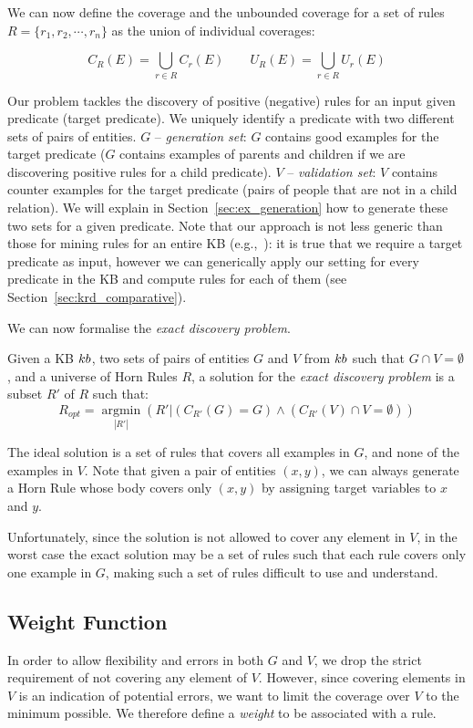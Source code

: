 We can now define the coverage and the unbounded coverage for a set of rules $R=\{r_1,r_2,\cdots,r_n\}$ as the union of individual coverages:

$$C_R(E) = \bigcup \limits_{r \in R} C_r(E) \qquad U_R(E) = \bigcup \limits_{r \in R} U_r(E) $$

Our problem tackles the discovery of positive (negative) rules for an input given predicate (target predicate). We uniquely identify a predicate with two different sets of pairs of entities.
$G$ -- \emph{generation set}: $G$ contains good examples for the target predicate ($G$ contains examples of parents and children if we are discovering positive rules for a child predicate).
$V$ -- \emph{validation set}: $V$ contains counter examples for the target predicate (pairs of people that are not in a child relation).
We will explain in Section~\ref{sec:ex_generation} how to generate these two sets for a given predicate. Note that our approach is not less generic than those for mining rules for an entire KB (e.g.,~\cite{abedjan2014amending,galarraga2015fast}): it is true that we require a target predicate as input, however we can generically apply our setting for every predicate in the KB and compute rules for each of them (see Section~\ref{sec:krd_comparative}).

We can now formalise the \emph{exact discovery problem}.
\begin{definition}
	Given a KB ${\sc kb}$, two sets of pairs of entities $G$ and $V$ from ${\sc kb}$ such that $G \cap V = \emptyset$, and a universe of Horn Rules $R$, a solution for the \emph{exact discovery problem} is a subset $R'$ of $R$  such that:
	$$R_{opt}=\underset{|R'|}{\operatorname{argmin}}(R'|(C_{R'}(G) = G) \wedge (C_{R'}(V) \cap V = \emptyset) )$$
\end{definition}
The ideal solution is a set of rules that covers all examples in $G$, and none of the examples in $V$. Note that given a pair of entities $(x,y)$, we can always generate a Horn Rule whose body covers only $(x,y)$ by assigning target variables to $x$ and $y$.

Unfortunately, since the solution is not allowed to cover any element in $V$, in the worst case the exact solution may be a set of rules such that each rule covers only one example in $G$, making such a set of rules difficult to use and understand.

\subsection{Weight Function} \label{sec:krd_weight_fun}
In order to allow flexibility and errors in both $G$ and $V$, we drop the strict requirement of not covering any element of $V$. However, since covering elements in $V$ is an indication of potential errors, we want to limit the coverage over $V$ to the minimum possible. We therefore define a \emph{weight} to be associated with a rule.

